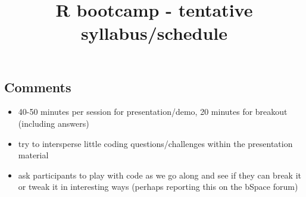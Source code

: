 \documentclass[12pt]{article}\usepackage{graphicx, color}
\begin{document}
\title{R bootcamp - tentative syllabus/schedule}

\maketitle



\subsection*{Comments}
\begin{itemize}
\item 40-50 minutes per session for presentation/demo, 20 minutes for breakout
(including answers)
\item try to intersperse little coding questions/challenges within the presentation
material
\item ask participants to play with code as we go along and see if they
can break it or tweak it in interesting ways (perhaps reporting this
on the bSpace forum)
\end{itemize}
\end{document}
